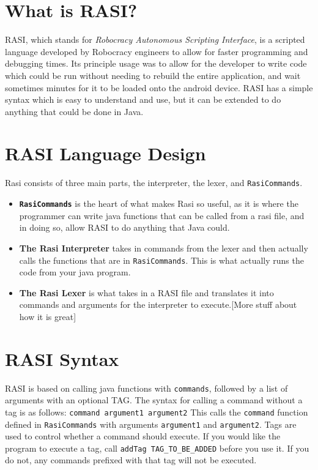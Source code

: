 \documentclass{article}
\begin{document}
\section{What is RASI?}
RASI, which stands for \textit{Robocracy Autonomous Scripting Interface}, is a scripted language developed by Robocracy engineers to allow for faster programming and debugging times. Its principle usage was to allow for the developer to write code which could be run without needing to rebuild the entire application, and wait sometimes minutes for it to be loaded onto the android device. RASI has a simple syntax which is easy to understand and use, but it can be extended to do anything that could be done in Java.

\section{RASI Language Design}
Rasi consists of three main parts, the interpreter, the lexer, and \texttt{RasiCommands}.
\begin{itemize}
  \item \textbf{\texttt{RasiCommands}} is the heart of what makes Rasi so useful, as it is where the programmer can write java functions that can be called from a rasi file, and in doing so, allow RASI to do anything that Java could.
  \item \textbf{The Rasi Interpreter} takes in commands from the lexer and then actually calls the functions that are in \texttt{RasiCommands}. This is what actually runs the code from your java program.
  \item \textbf{The Rasi Lexer} is what takes in a RASI file and translates it into commands and arguments for the interpreter to execute.[More stuff about how it is great]
\end{itemize}

\section{RASI Syntax}
RASI is based on calling java functions with \texttt{commands}, followed by a list of arguments with an optional TAG.
The syntax for calling a command without a tag is as follows: \texttt{command argument1 argument2} This calls the \texttt{command} function defined in \texttt{RasiCommands} with arguments \texttt{argument1} and \texttt{argument2}.
Tags are used to control whether a command should execute. If you would like the program to execute a tag, call \texttt{addTag TAG\_TO\_BE\_ADDED} before you use it. If you do not, any commands prefixed with that tag will not be executed.
\end{document}
